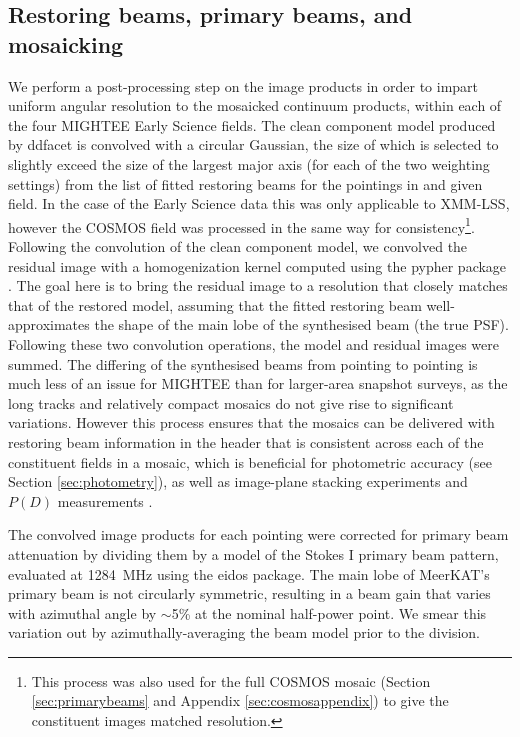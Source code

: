 \documentclass[usenatbib,usedcolumn]{mnras}
\begin{document}
\subsection{Restoring beams, primary beams, and mosaicking}
\label{sec:pbcor}

We perform a post-processing step on the image products in order to impart uniform angular resolution to the mosaicked continuum products, within each of the four MIGHTEE Early Science fields. The clean component model produced by {\sc ddfacet} is convolved with a circular Gaussian, the size of which is selected to slightly exceed the size of the largest major axis (for each of the two weighting settings) from the list of fitted restoring beams for the pointings in and given field. In the case of the Early Science data this was only applicable to XMM-LSS, however the COSMOS field was processed in the same way for consistency\footnote{This process was also used for the full COSMOS mosaic (Section \ref{sec:primarybeams} and Appendix \ref{sec:cosmosappendix}) to give the constituent images matched resolution.}. Following the convolution of the clean component model, we convolved the residual image with a homogenization kernel computed using the {\sc pypher} package \citep{boucaud16}. The goal here is to bring the residual image to a resolution that closely matches that of the restored model, assuming that the fitted restoring beam well-approximates the shape of the main lobe of the synthesised beam (the true PSF). Following these two convolution operations, the model and residual images were summed. The differing of the synthesised beams from pointing to pointing is much less of an issue for MIGHTEE than for larger-area snapshot surveys, as the long tracks and relatively compact mosaics do not give rise to significant variations. However this process ensures that the mosaics can be delivered with restoring beam information in the header that is consistent across each of the constituent fields in a mosaic, which is beneficial for photometric accuracy (see Section \ref{sec:photometry}), as well as image-plane stacking experiments and $P(D)$ measurements \citep{scheuer1957,condon2012}.

The convolved image products for each pointing were corrected for primary beam attenuation by dividing them by a model of the Stokes I primary beam pattern, evaluated at 1284~MHz using the {\sc eidos} \citep{asad2021} package. The main lobe of MeerKAT's primary beam is not circularly symmetric, resulting in a beam gain that varies with azimuthal angle by $\sim$5\% at the nominal half-power point. We smear this variation out by azimuthally-averaging the beam model prior to the division.
\end{document}
